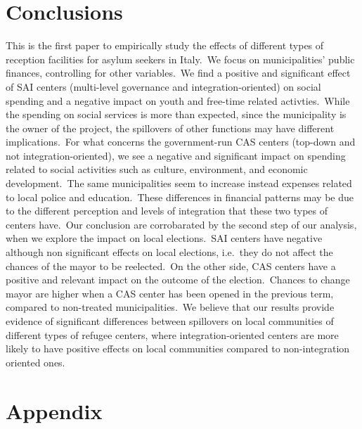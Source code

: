 \documentclass[authoryear,preprint,review,12pt]{elsarticle}
\begin{document}
\section*{Conclusions}

\normalsize

\noindent
This is the first paper to empirically study the effects of different types of reception facilities for asylum seekers in Italy.\ We focus on municipalities' public finances, controlling for other variables.\ We find a positive and significant effect of SAI centers (multi-level governance and integration-oriented) on social spending and a negative impact on youth and free-time related activties.\ While the spending on social services is more than expected, since the municipality is the owner of the project, the spillovers of other functions may have different implications.\ For what concerns the government-run CAS centers (top-down and not integration-oriented), we see a negative and significant impact on spending related to social activities such as culture, environment, and economic development.\ The same municipalities seem to increase instead expenses related to local police and education.\ These differences in financial patterns may be due to the different perception and levels of integration that these two types of centers have.\ Our conclusion are corrobarated by the second step of our analysis, when we explore the impact on local elections.\ SAI centers have negative although non significant effects on local elections, i.e.\ they do not affect the chances of the mayor to be reelected.\ On the other side, CAS centers have a positive and relevant impact on the outcome of the election.\ Chances to change mayor are higher when a CAS center has been opened in the previous term, compared to non-treated municipalities.\ We believe that our results provide evidence of significant differences between spillovers on local communities of different types of refugee centers, where integration-oriented centers are more likely to have positive effects on local communities compared to non-integration oriented ones.\\ 





\section{Appendix}



\end{document}
